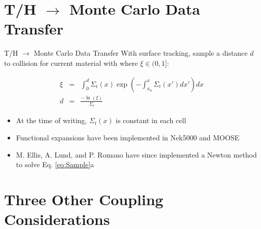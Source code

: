 \documentclass[10pt]{beamer}
\begin{document}
\section{T/H \(\rightarrow\) Monte Carlo Data Transfer}

\begin{frame}{T/H \(\rightarrow\) Monte Carlo Data Transfer}
With surface tracking, sample a distance \(d\) to collision for current material with where \(\xi\in(0,1]\):

\begin{subequations}
\label{eq:Sample}
\begin{eqnarray}
\xi&=&\int_0^d\Sigma_t(x)\exp{\left(-\int_{x_0}^x\Sigma_t(x')dx'\right)}dx\\
d&=&\frac{-\ln{(\xi)}}{\Sigma_t}
\end{eqnarray}
\end{subequations}

\vspace{0.25cm}
\begin{itemize}
\item At the time of writing, \(\Sigma_t(x)\) is constant in each cell
\item Functional expansions have been implemented in Nek5000 and MOOSE
\item M. Ellis, A. Lund, and P. Romano have since implemented a Newton method \cite{brown_martin_direct} to solve Eq. \eqref{eq:Sample}a
\end{itemize}
\end{frame}

\section{Three Other Coupling Considerations}
\end{document}
